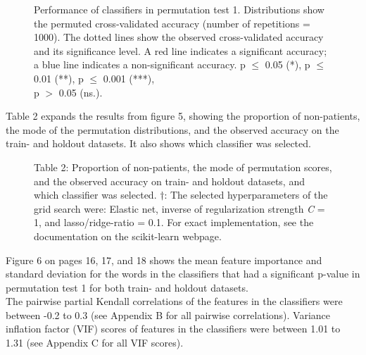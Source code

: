 \documentclass[11pt, a4paper]{article}
\begin{document}
\begin{figure}[hbt!]
\centering

\caption{\label{fig:data} Performance of classifiers in permutation test 1. Distributions show the permuted cross-validated accuracy (number of repetitions = 1000). The dotted lines show the observed cross-validated accuracy and its significance level. A red line indicates a significant accuracy; a blue line indicates a non-significant accuracy. p $\leq$ 0.05 (*), p $\leq$ 0.01 (**), p $\leq$ 0.001 (***), \\ p $>$ 0.05 (ns.).}
\end{figure}

\newpage

Table 2 expands the results from figure 5, showing the proportion of non-patients, the mode of the permutation distributions, and the observed accuracy on the train- and holdout datasets. It also shows which classifier was selected.
\begin{figure}[hbt!]
\centering

\caption*{Table 2: Proportion of non-patients, the mode of permutation scores, and the observed accuracy on train- and holdout datasets, and which classifier was selected. $ \dag  $: The selected hyperparameters of the grid search were: Elastic net, inverse of regularization strength \textit{C} = 1, and lasso/ridge-ratio = 0.1. For exact implementation, see the documentation on the scikit-learn webpage. 
 }
\end{figure}


Figure 6 on pages 16, 17, and 18 shows the mean feature importance and standard deviation for the words in the classifiers that had a significant p-value in permutation test 1 for both train- and holdout datasets. \\

The pairwise partial Kendall correlations of the features in the classifiers were between -0.2 to 0.3 (see Appendix B for all pairwise correlations). Variance inflation factor (VIF) scores of features in the classifiers were between 1.01 to 1.31 (see Appendix C for all VIF scores).


\begin{figure}
\centering
\vspace{-0.7cm}

\end{figure}

\begin{figure}
\centering
\vspace{-0.7cm}

\end{figure}
\end{document}
